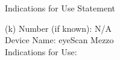 \newpage
{}

\begin{center}
  \Large{Indications for Use Statement}\\[.5in]
\end{center}


\onehalfspacing

(k) Number (if known): N/A \\
Device Name: eyeScan Mezzo \\
Indications for Use: 

